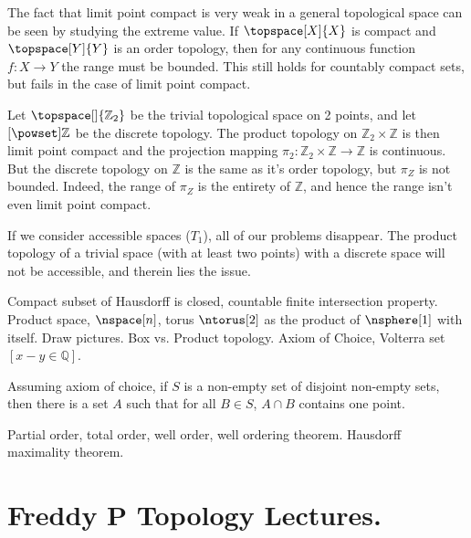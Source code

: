 \documentclass{article}                                                        %
\begin{document}
        The fact that limit point compact is very weak in a general topological
        space can be seen by studying the extreme value. If
        $\topspace[X]{X}$ is compact and $\topspace[Y]{Y}$ is an order topology,
        then for any continuous function $f:X\rightarrow{Y}$ the range must be
        bounded. This still holds for countably compact sets, but fails in the
        case of limit point compact.
        \begin{example}
            Let $\topspace[\empty]{\mathbb{Z}_{2}}$ be the trivial topological
            space on 2 points, and let $\mathcal[\powset]{\mathbb{Z}}$ be the
            discrete topology. The product topology on
            $\mathbb{Z}_{2}\times\mathbb{Z}$ is then limit point compact and the
            projection mapping
            $\pi_{2}:\mathbb{Z}_{2}\times\mathbb{Z}\rightarrow\mathbb{Z}$ is
            continuous. But the discrete topology on $\mathbb{Z}$ is the same as
            it's order topology, but $\pi_{Z}$ is not bounded. Indeed, the range
            of $\pi_{Z}$ is the entirety of $\mathbb{Z}$, and hence the range
            isn't even limit point compact.
        \end{example}
        If we consider accessible spaces ($T_{1}$), all of our problems
        disappear. The product topology of a trivial space (with at least two
        points) with a discrete space will not be accessible, and therein lies
        the issue.
        \par\hfill\par
        Compact subset of Hausdorff is closed, countable finite intersection
        property. Product space, $\nspace[n]$, torus $\ntorus[2]$ as the product
        of $\nsphere[1]$ with itself. Draw pictures. Box vs. Product topology.
        Axiom of Choice, Volterra set $[x-y\in\mathbb{Q}]$.
        \begin{theorem}
            Assuming axiom of choice, if $S$ is a non-empty set of disjoint
            non-empty sets, then there is a set $A$ such that for all
            $B\in{S}$, $A\cap{B}$ contains one point.
        \end{theorem}
        Partial order, total order, well order, well ordering theorem. Hausdorff
        maximality theorem.
    \section{Freddy P Topology Lectures.}
\end{document}
